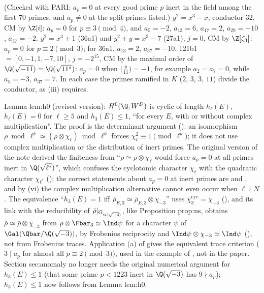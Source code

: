 \begin{example}\label{ex:ant:cmcurves}
(Checked with PARI: $a_p=0$ at every good prime $p$ inert in the field among the first $70$ primes, and $a_p\ne0$ at the split primes listed.)
$y^2=x^3-x$, conductor $32$, CM by $\Z[i]$: $a_p=0$ for $p\equiv3\pmod 4$, and $a_5=-2$, $a_{13}=6$, $a_{17}=2$, $a_{29}=-10$, $a_{37}=-2$.
$y^2=x^3+1$ (36a1) and $y^2+y=x^3-7$ (27a1), $j=0$, CM by $\Z[\zeta_3]$: $a_p=0$ for $p\equiv2\pmod3$; for 36a1, $a_{13}=2$, $a_{37}=-10$.
121b1 $=[0,-1,1,-7,10]$, $j=-2^{15}$, CM by the maximal order of $\Q(\sqrt{-11})=\Q(\sqrt{11^*})$: $a_p=0$ when $\bigl(\frac p{11}\bigr)=-1$, for example $a_2=a_7=0$,
while $a_5=-3$, $a_{37}=7$. In each case the primes ramified in $K$ ($2$, $3$, $3$, $11$) divide the conductor, as (iii) requires.
\end{example}

\begin{paperlink}\label{pl:ant:h0}
Lemma lem:h0 (revised version): $H^0(\Q,W^D)$ is cyclic of length $h_\ell(E)$, $h_\ell(E)=0$ for $\ell\ge5$ and $h_3(E)\le1$, ``for every $E$, with or without complex
multiplication''. The proof is the determinant argument (): an isomorphism $\rho\bmod\ell^k\simeq(\rho\otimes\chi_\ell)\bmod\ell^k$ forces
$\chi_\ell^2\equiv1\pmod{\ell^k}$; it does not use complex multiplication or the distribution of inert primes. The original version of the note derived the finiteness
from ``$\rho\simeq\rho\otimes\chi_\ell$ would force $a_p=0$ at all primes inert in $\Q(\sqrt{\ell^*})$'', which confuses the cyclotomic character $\chi_\ell$ with the
quadratic character $\chi_{\ell^*}$ (); the correct statements about $a_p=0$ at inert primes are  and
, and by (vi) the complex multiplication alternative cannot even occur when $\ell\nmid N$. The equivalence ``$h_3(E)=1$ iff
$\bar\rho_{E,3}\simeq\bar\rho_{E,3}\otimes\chi_{-3}$'' uses $\bar\chi_3^{\mathrm{cyc}}=\chi_{-3}$ (), and its link with the reducibility of $\bar\rho|_{G_{\Q(\sqrt{-3})}}$, like
Proposition prop:ns, obtains $\bar\rho\simeq\bar\rho\otimes\chi_{-3}$ from $\bar\rho\otimes\Fbar_3\simeq\Ind\psi$ for a character $\psi$ of
$\Gal(\Qbar/\Q(\sqrt{-3}))$, by Frobenius reciprocity and $\Ind\psi\otimes\chi_{-3}\simeq\Ind\psi$ (), not from Frobenius traces. Application (a) of
 gives the equivalent trace criterion ($3\mid a_p$ for almost all $p\equiv2\pmod3$), used in the example of , not in the
paper. Section sec:anomaly no longer needs the original numerical argument for $h_3(E)\le1$ (that some prime $p<1223$
inert in $\Q(\sqrt{-3})$ has $9\nmid a_p$); $h_3(E)\le1$ now follows from Lemma lem:h0.
\end{paperlink}

